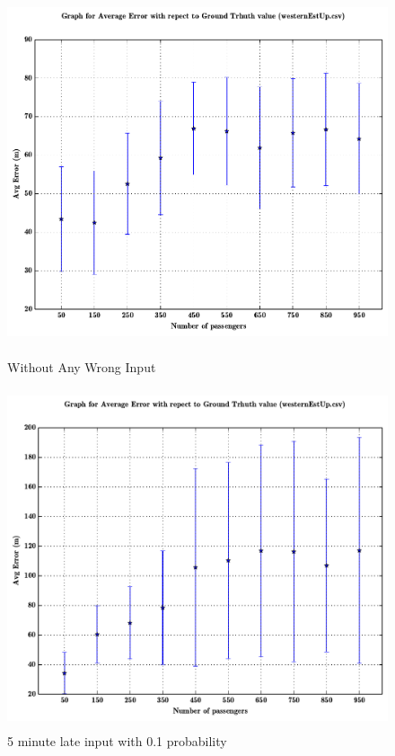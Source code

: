 \documentclass[a4paper,12pt]{report}
\begin{document}
\begin{figure}[h!]

\centering
\includegraphics[height=10cm,width=17cm]{00_.pdf}
\caption{Without Any Wrong Input}

\centering
\includegraphics[height=10cm,width=17cm]{01_5minlate.pdf}
\caption{5 minute late input with 0.1 probability}

\end{figure}
\end{document}

